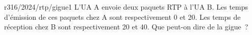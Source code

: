 \begin{question}{r316/2024/rtp/gigue1}
    L'UA A envoie deux paquets RTP à l'UA B. Les temps d'émission de
    ces paquets chez A sont respectivement 0 et 20. Les temps de
    réception chez B sont respectivement 20 et 40. Que peut-on dire de
    la gigue~?
    \begin{reponses}
    \end{reponses}
\end{question}
